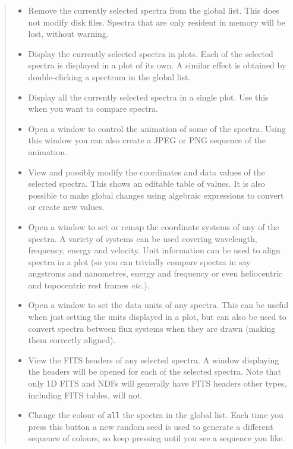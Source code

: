 \documentclass[twoside,11pt]{article}
\newcommand{\htmladdimg}[1]{}
\newcommand{\latexhtml}[2]{#1}
\renewcommand{\_}{\texttt{\symbol{95}}}
\newcommand{\inline}[1]
        {\latexhtml{\texttt{[image: sun243\_figures/\#1]}}
        {\htmladdimg[align=center]{#1.gif}}}
\newcommand{\hitext}[1]{\texttt{#1}}
\newcommand{\etc}{\textit{etc.}}
\begin{document}
\begin{quote}
\begin{itemize}
  \item[\inline{remove}] Remove the currently selected spectra from the
  global list. This does not modify disk files. Spectra that are only
  resident in memory will be lost, without warning.

  \item[\inline{display}] Display the currently selected spectra in
  plots. Each of the selected spectra is displayed in a plot of its
  own. A similar effect is obtained by double-clicking a spectrum in the
  global list.

  \item[\inline{multidisplay}] Display all the currently selected
  spectra in a single plot. Use this when you want to compare spectra.

  \item[\inline{animate}] Open a window to control the animation of some
  of the spectra. Using this window you can also create a JPEG or PNG
  sequence of the animation.

  \item[\inline{table}] View and possibly modify the coordinates and
  data values of the selected spectra. This shows an editable table of
  values. It is also possible to make global changes using
  algebraic expressions to convert or create new values.

  \item[\inline{xunits}] Open a window to set or remap the coordinate
  systems of any of the spectra. A variety of systems can be used
  covering wavelength, frequency, energy and velocity. Unit
  information can be used to align spectra in a plot (so you can
  trivially compare spectra in say angstroms and nanometres,
  energy and frequency or even heliocentric and topocentric rest frames
  \etc).

  \item[\inline{yunits}] Open a window to set the data units of any spectra.
  This can be useful when just setting the units displayed in a plot, but
  can also be used to convert spectra between flux systems when they are
  drawn (making them correctly aligned).

  \item[\inline{fits}] View the FITS headers of any selected spectra.
  A window displaying the headers will be opened for each of the selected
  spectra. Note that only 1D FITS and NDFs will generally have FITS headers
  other types, including FITS tables, will not.

  \item[\inline{rainbow}] Change the colour of \hitext{all} the spectra
  in the global list. Each time you press this button a new random seed
  is used to generate a different sequence of colours, so keep pressing
  until you see a sequence you like.


\end{itemize}
\end{quote}
\end{document}
